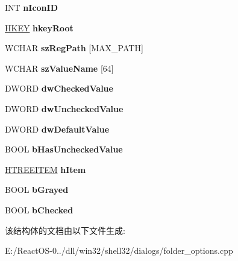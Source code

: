 \begin{DoxyCompactItemize}
I\+NT {\bfseries n\+Icon\+ID}
\item 
\mbox{\label{struct_a_d_v_a_n_c_e_d___e_n_t_r_y_ad0b9ce946e07446641897df99b3e23bd}} 
\hyperlink{interfacevoid}{H\+K\+EY} {\bfseries hkey\+Root}
\item 
\mbox{\label{struct_a_d_v_a_n_c_e_d___e_n_t_r_y_aa2307ec180354f6ad640ef4c6f72a0ef}} 
W\+C\+H\+AR {\bfseries sz\+Reg\+Path} \mbox{[}M\+A\+X\+\_\+\+P\+A\+TH\mbox{]}
\item 
\mbox{\label{struct_a_d_v_a_n_c_e_d___e_n_t_r_y_aa53615f57a0b1a79c5d2ae1deeb4d738}} 
W\+C\+H\+AR {\bfseries sz\+Value\+Name} \mbox{[}64\mbox{]}
\item 
\mbox{\label{struct_a_d_v_a_n_c_e_d___e_n_t_r_y_a731acdf4d8d2e8b45d85cd4f29b19e25}} 
D\+W\+O\+RD {\bfseries dw\+Checked\+Value}
\item 
\mbox{\label{struct_a_d_v_a_n_c_e_d___e_n_t_r_y_ad6b81866de8541bc81357cd7e6f619da}} 
D\+W\+O\+RD {\bfseries dw\+Unchecked\+Value}
\item 
\mbox{\label{struct_a_d_v_a_n_c_e_d___e_n_t_r_y_a234a6e593fab001b22b43b9ba36d5da5}} 
D\+W\+O\+RD {\bfseries dw\+Default\+Value}
\item 
\mbox{\label{struct_a_d_v_a_n_c_e_d___e_n_t_r_y_a97258cac16be46f54af014ab4a776635}} 
B\+O\+OL {\bfseries b\+Has\+Unchecked\+Value}
\item 
\mbox{\label{struct_a_d_v_a_n_c_e_d___e_n_t_r_y_a4e24451748b94f5f405478f112d94c05}} 
\hyperlink{struct___t_r_e_e_i_t_e_m}{H\+T\+R\+E\+E\+I\+T\+EM} {\bfseries h\+Item}
\item 
\mbox{\label{struct_a_d_v_a_n_c_e_d___e_n_t_r_y_ae502800c05abfdfde5144d46ca2990cd}} 
B\+O\+OL {\bfseries b\+Grayed}
\item 
\mbox{\label{struct_a_d_v_a_n_c_e_d___e_n_t_r_y_a4db99bf0ada3c2edde70be71d4f0ee46}} 
B\+O\+OL {\bfseries b\+Checked}
\end{DoxyCompactItemize}


该结构体的文档由以下文件生成\+:\begin{DoxyCompactItemize}
\item 
E\+:/\+React\+O\+S-\/0../dll/win32/shell32/dialogs/folder\+\_\+options.\+cpp\end{DoxyCompactItemize}

